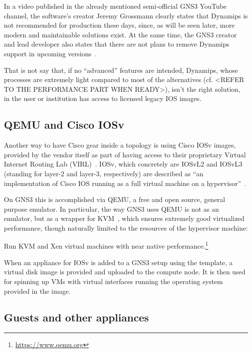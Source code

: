 In a video published in the already mentioned semi-official GNS3 YouTube channel, the software's creator Jeremy Grossmann clearly states that Dynamips is not recommended for production these days, since, as will be seen later, more modern and maintainable solutions exist. At the same time, the GNS3 creator and lead developer also states that there are not plans to remove Dynamips support in upcoming versions~\cite{ytdynamipsvpcs}.

That is not say that, if no ``advanced'' features are intended, Dynamips, whose processes are extremely light compared to most of the alternatives (cf. <REFER TO THE PERFORMANCE PART WHEN READY>), isn't the right solution, in the user or institution has access to licensed legacy IOS images. %

\subsection{QEMU and Cisco IOSv}
\label{subsec:gns3ciscoiosv}

Another way to have Cisco gear inside a topology is using Cisco IOSv images, provided by the vendor itself as part of having access to their proprietary Virtual Internet Routing Lab (VIRL)~\cite{ciscovirl}.
IOSv, which concretely are IOSvL2 and IOSvL3 (standing for layer-2 and layer-3, respectively) are described as ``an implementation of Cisco IOS running as a full virtual machine on a hypervisor''~\cite{ciscoiosvinfo}.

On GNS3 this is accomplished via QEMU, a free and open source, general purpose emulator.
In particular, the way GNS3 uses QEMU is not as an emulator, but as a wrapper for KVM~\cite{whatiskvm}, which ensures extremely good virtualized performance, though naturally limited to the resources of the hypervisor machine:
\begin{displayquote}
Run KVM and Xen virtual machines with near native performance.\footnote{\url{https://www.qemu.org}}
\end{displayquote}

When an appliance for IOSv is added to a GNS3 setup using the template, a virtual disk image is provided and uploaded to the compute node.
It is then used for spinning up VMs with virtual interfaces running the operating system provided in the image. %

\subsection{Guests and other appliances}
\label{subsec:gns3guestsappliances}

